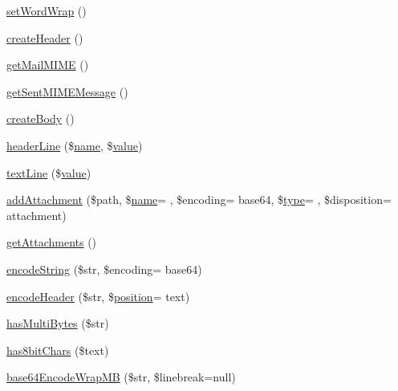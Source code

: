 \begin{DoxyCompactItemize}
\item 
\hyperlink{class_p_h_p_mailer_ab3b2787c3d322ed943f863c6bf2e4bc8}{set\+Word\+Wrap} ()
\item 
\hyperlink{class_p_h_p_mailer_a0e6615e9843f58e99362166dd25a185b}{create\+Header} ()
\item 
\hyperlink{class_p_h_p_mailer_a4ced769572258a705d3d66f5c2243c47}{get\+Mail\+M\+I\+ME} ()
\item 
\hyperlink{class_p_h_p_mailer_a705aa0508caf1e7c3e6ea4443fe1f1c6}{get\+Sent\+M\+I\+M\+E\+Message} ()
\item 
\hyperlink{class_p_h_p_mailer_ad8d982cb84383c36585dab8ac1a01414}{create\+Body} ()
\item 
\hyperlink{class_p_h_p_mailer_a76caf3b881a28504c1bebedd520004bd}{header\+Line} (\$\hyperlink{user_8php_a765af5e9671743530143a6d3670fd9a6}{name}, \$\hyperlink{fullpage_2plugin_8min_8js_ac56c57897e10f699d124e0103921aa20}{value})
\item 
\hyperlink{class_p_h_p_mailer_a77108e49f31bbd9d96ec281de118b815}{text\+Line} (\$\hyperlink{fullpage_2plugin_8min_8js_ac56c57897e10f699d124e0103921aa20}{value})
\item 
\hyperlink{class_p_h_p_mailer_a167cba8879ea72eae2583738abd0f68d}{add\+Attachment} (\$path, \$\hyperlink{user_8php_a765af5e9671743530143a6d3670fd9a6}{name}= \textquotesingle{}\textquotesingle{}, \$encoding= \textquotesingle{}base64\textquotesingle{}, \$\hyperlink{_ossn_wall_2actions_2wall_2post_2group_8php_a2dc1bb4e1ed0029daa81ac0776b14b51}{type}= \textquotesingle{}\textquotesingle{}, \$disposition= \textquotesingle{}attachment\textquotesingle{})
\item 
\hyperlink{class_p_h_p_mailer_aa91862c4e237ee5b53083f41633babb6}{get\+Attachments} ()
\item 
\hyperlink{class_p_h_p_mailer_a5c4cad1d383b64464ad2a2bc336db07b}{encode\+String} (\$str, \$encoding= \textquotesingle{}base64\textquotesingle{})
\item 
\hyperlink{class_p_h_p_mailer_aea5a3301763364fe9b62c36d06c08e5a}{encode\+Header} (\$str, \$\hyperlink{jquery-ui_8min_8js_a46cd3bf7f3b19525671d8317c10bdc49}{position}= \textquotesingle{}text\textquotesingle{})
\item 
\hyperlink{class_p_h_p_mailer_a6bb4300a48c25d9fdec7fddf4f8e2549}{has\+Multi\+Bytes} (\$str)
\item 
\hyperlink{class_p_h_p_mailer_a00a5a1581e01bf5ae1a012b55a7f2b12}{has8bit\+Chars} (\$text)
\item 
\hyperlink{class_p_h_p_mailer_aa3aba7f0151d96a9a5d56d8ee5be8aab}{base64\+Encode\+Wrap\+MB} (\$str, \$linebreak=null)

\end{DoxyCompactItemize}
